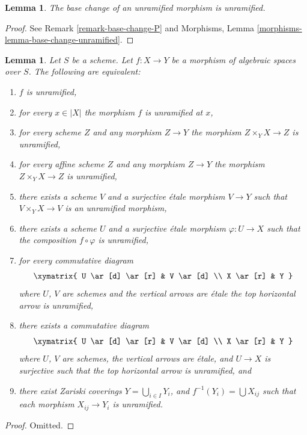 \documentclass{stacks-project}
\theoremstyle{plain}
\newtheorem{lemma}[subsection]{Lemma}
\theoremstyle{definition}
\theoremstyle{remark}
\numberwithin{equation}{subsection}
\begin{document}
\begin{lemma}
\label{lemma-base-change-unramified}
The base change of an unramified morphism is unramified.
\end{lemma}

\begin{proof}
See Remark \ref{remark-base-change-P} and
Morphisms, Lemma \ref{morphisms-lemma-base-change-unramified}.
\end{proof}

\begin{lemma}
\label{lemma-unramified-local}
Let $S$ be a scheme.
Let $f : X \to Y$ be a morphism of algebraic spaces over $S$.
The following are equivalent:
\begin{enumerate}
\item $f$ is unramified,
\item for every $x \in |X|$ the morphism $f$ is unramified at $x$,
\item for every scheme $Z$ and any morphism $Z \to Y$ the morphism
$Z \times_Y X \to Z$ is unramified,
\item for every affine scheme $Z$ and any morphism
$Z \to Y$ the morphism $Z \times_Y X \to Z$ is unramified,
\item there exists a scheme $V$ and a surjective \'etale morphism
$V \to Y$ such that $V \times_Y X \to V$ is an unramified morphism,
\item there exists a scheme $U$ and a surjective \'etale morphism
$\varphi : U \to X$ such that the composition $f \circ \varphi$
is unramified,
\item for every commutative diagram
$$
\xymatrix{
U \ar[d] \ar[r] & V \ar[d] \\
X \ar[r] & Y
}
$$
where $U$, $V$ are schemes and the vertical arrows are \'etale
the top horizontal arrow is unramified,
\item there exists a commutative diagram
$$
\xymatrix{
U \ar[d] \ar[r] & V \ar[d] \\
X \ar[r] & Y
}
$$
where $U$, $V$ are schemes, the vertical arrows are \'etale, and
$U \to X$ is surjective such that the top horizontal arrow is unramified, and
\item there exist Zariski coverings $Y = \bigcup_{i \in I} Y_i$,
and $f^{-1}(Y_i) = \bigcup X_{ij}$ such that
each morphism $X_{ij} \to Y_i$ is unramified.
\end{enumerate}
\end{lemma}

\begin{proof}
Omitted.
\end{proof}
\end{document}
